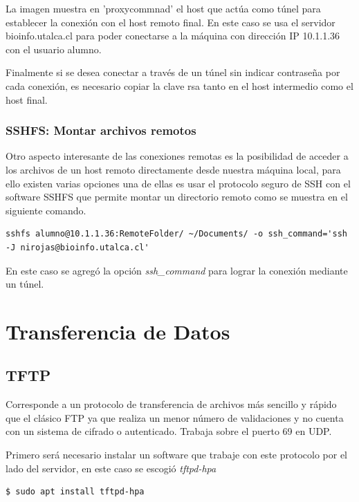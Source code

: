 \documentclass[12pt]{article}
\begin{document}
La imagen muestra en 'proxycommnad' el host que actúa como túnel para establecer la conexión con el host remoto final. En este caso se usa el servidor bioinfo.utalca.cl para poder conectarse a la máquina con dirección IP 10.1.1.36 con el usuario alumno.

Finalmente si se desea conectar a través de un túnel sin indicar contraseña por cada conexión, es necesario copiar la clave rsa tanto en el host intermedio como el host final.

\subsubsection{ SSHFS: Montar archivos remotos}

Otro aspecto interesante de las conexiones remotas es la posibilidad de acceder a los archivos de un host remoto directamente desde nuestra máquina local, para ello existen varias opciones una de ellas es usar el protocolo seguro de SSH con el software SSHFS que permite montar un directorio remoto como se muestra en el siguiente comando.

\begin{lstlisting}[frame=single]
sshfs alumno@10.1.1.36:RemoteFolder/ ~/Documents/ -o ssh_command='ssh -J nirojas@bioinfo.utalca.cl'
\end{lstlisting}

En este caso se agregó la opción \emph{ssh\_command} para lograr la conexión mediante un túnel.

\section{Transferencia de Datos}

\subsection{TFTP}

Corresponde a un protocolo de transferencia de archivos más sencillo y rápido que el clásico FTP ya que realiza un menor número de validaciones y no cuenta con un sistema de cifrado o autenticado. Trabaja sobre el puerto 69 en UDP.\cite{tftp}

Primero será necesario instalar un software que trabaje con este protocolo por el lado del servidor, en este caso se escogió \emph{tftpd-hpa}

\begin{lstlisting}[frame=single]
$ sudo apt install tftpd-hpa
\end{lstlisting}
\end{document}
